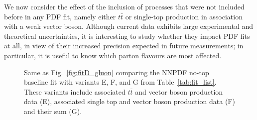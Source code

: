 \documentclass[withindex,glossary]{cam-thesis}
\begin{document}
We now consider the effect of the inclusion of processes that were not included before in any PDF fit, namely either $t\bar{t}$ or single-top production in association with a weak vector boson.
%
Although current data exhibits large experimental and theoretical uncertainties, it is interesting to
study whether  they impact PDF fits at all, in view of their increased precision expected in future measurements; in particular, it is useful to know which parton flavours are most affected.

\begin{figure}[H]
\centering
        \caption{Same as Fig.~\ref{fig:fitD_gluon} comparing the NNPDF no-top
          baseline fit with variants E, F, and G from Table~\ref{tab:fit_list}.
          These variants include associated $t\bar{t}$ and vector boson
          production data (E), associated single top and vector boson
          production data (F) and their sum (G).
        }
\label{fig:fitEFG}
\end{figure}
\end{document}
